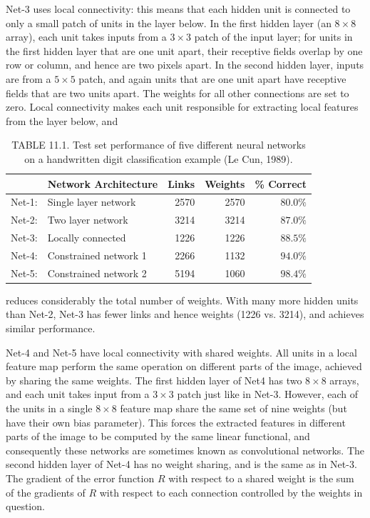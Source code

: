 \documentclass[10pt]{article}
\begin{document}
Net-3 uses local connectivity: this means that each hidden unit is connected to only a small patch of units in the layer below. In the first hidden layer (an $8 \times 8$ array), each unit takes inputs from a $3 \times 3$ patch of the input layer; for units in the first hidden layer that are one unit apart, their receptive fields overlap by one row or column, and hence are two pixels apart. In the second hidden layer, inputs are from a $5 \times 5$ patch, and again units that are one unit apart have receptive fields that are two units apart. The weights for all other connections are set to zero. Local connectivity makes each unit responsible for extracting local features from the layer below, and

\begin{table}[h]
\begin{center}
\captionsetup{labelformat=empty}
\caption{TABLE 11.1. Test set performance of five different neural networks on a handwritten digit classification example (Le Cun, 1989).}
\begin{tabular}{ll|r|r|r}
\hline
 & Network Architecture & Links & Weights & \% Correct \\
\hline
Net-1: & Single layer network & 2570 & 2570 & $80.0 \%$ \\
\hline
Net-2: & Two layer network & 3214 & 3214 & $87.0 \%$ \\
\hline
Net-3: & Locally connected & 1226 & 1226 & $88.5 \%$ \\
\hline
Net-4: & Constrained network 1 & 2266 & 1132 & $94.0 \%$ \\
\hline
Net-5: & Constrained network 2 & 5194 & 1060 & $98.4 \%$ \\
\hline
\end{tabular}
\end{center}
\end{table}

reduces considerably the total number of weights. With many more hidden units than Net-2, Net-3 has fewer links and hence weights (1226 vs. 3214), and achieves similar performance.

Net-4 and Net-5 have local connectivity with shared weights. All units in a local feature map perform the same operation on different parts of the image, achieved by sharing the same weights. The first hidden layer of Net4 has two $8 \times 8$ arrays, and each unit takes input from a $3 \times 3$ patch just like in Net-3. However, each of the units in a single $8 \times 8$ feature map share the same set of nine weights (but have their own bias parameter). This forces the extracted features in different parts of the image to be computed by the same linear functional, and consequently these networks are sometimes known as convolutional networks. The second hidden layer of Net-4 has no weight sharing, and is the same as in Net-3. The gradient of the error function $R$ with respect to a shared weight is the sum of the gradients of $R$ with respect to each connection controlled by the weights in question.
\end{document}
